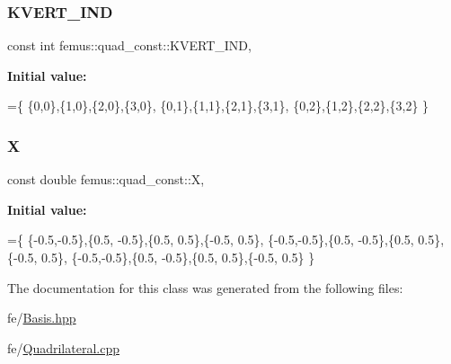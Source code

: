 \subsubsection{\texorpdfstring{K\+V\+E\+R\+T\+\_\+\+I\+ND}{KVERT\_IND}}
{\footnotesize\ttfamily const int femus\+::quad\+\_\+const\+::\+K\+V\+E\+R\+T\+\_\+\+I\+ND\hspace{0.3cm}{\ttfamily [static]}, {\ttfamily [protected]}}

{\bfseries Initial value\+:}
\begin{DoxyCode}
=\{ 
    \{0,0\},\{1,0\},\{2,0\},\{3,0\},
    \{0,1\},\{1,1\},\{2,1\},\{3,1\},
    \{0,2\},\{1,2\},\{2,2\},\{3,2\}
  \}
\end{DoxyCode}
\mbox{\label{classfemus_1_1quad__const_a7850c4c850fa87c3238e94265ced07ba}} 
\subsubsection{\texorpdfstring{X}{X}}
{\footnotesize\ttfamily const double femus\+::quad\+\_\+const\+::X\hspace{0.3cm}{\ttfamily [static]}, {\ttfamily [protected]}}

{\bfseries Initial value\+:}
\begin{DoxyCode}
=\{ 
    \{-0.5,-0.5\},\{0.5, -0.5\},\{0.5, 0.5\},\{-0.5, 0.5\},
    \{-0.5,-0.5\},\{0.5, -0.5\},\{0.5, 0.5\},\{-0.5, 0.5\},
    \{-0.5,-0.5\},\{0.5, -0.5\},\{0.5, 0.5\},\{-0.5, 0.5\}
  \}
\end{DoxyCode}


The documentation for this class was generated from the following files\+:\begin{DoxyCompactItemize}
\item 
fe/\mbox{\hyperlink{_basis_8hpp}{Basis.\+hpp}}\item 
fe/\mbox{\hyperlink{_quadrilateral_8cpp}{Quadrilateral.\+cpp}}\end{DoxyCompactItemize}
